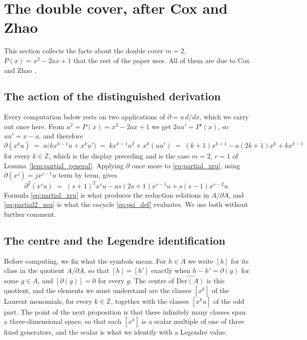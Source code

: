 \documentclass[11pt]{amsart}
\theoremstyle{definition}
\theoremstyle{remark}
\newcommand{\Z}{\mathbb{Z}}
\newcommand{\Der}{\mathrm{Der}}
\newcommand{\pa}{\partial}
\newcommand{\hDer}{\widehat{\Der(A)}}
\begin{document}
\section{The double cover, after Cox and Zhao}
\label{sec:quad_der}

This section collects the facts about the double cover $m=2$,
$P(x)=x^2-2ax+1$ that the rest of the paper uses. All of them are due to Cox
and Zhao \cite[\S2.1--\S2.2]{CoxZhao2018}.

\subsection{The action of the distinguished derivation}

Every computation below rests on two applications of $\pa=u\,d/dx$, which we
carry out once here. From $u^2=P(x)=x^2-2ax+1$ we get $2uu'=P'(x)$, so
$uu'=x-a$, and therefore
\begin{equation}\label{eq:partial_xru}
  \pa(x^k u) \;=\; u\bigl(kx^{k-1}u + x^ku'\bigr)
  \;=\; kx^{k-1}u^2 + x^k(uu')
  \;=\; (k+1)x^{k+1} - a(2k+1)x^k + kx^{k-1}
\end{equation}
for every $k\in\Z$, which is the display preceding \cite[(2.22)]{CoxZhao2018}
and is the case $m=2$, $r=1$ of Lemma~\ref{lem:partial_general}. Applying $\pa$
once more to \eqref{eq:partial_xru}, using $\pa(x^j)=jx^{j-1}u$ term by term,
gives
\begin{equation}\label{eq:partial2_xsu}
  \pa^2(x^s u) \;=\; (s+1)^2x^su - as(2s+1)x^{s-1}u + s(s-1)x^{s-2}u .
\end{equation}
Formula \eqref{eq:partial_xru} is what produces the reduction relations in
$A/\pa A$, and \eqref{eq:partial2_xsu} is what the cocycle
\eqref{eq:psi_def} evaluates. We use both without further comment.


\subsection{The centre and the Legendre identification}

Before computing, we fix what the symbols mean. For $h\in A$ we write $[h]$ for
its class in the quotient $A/\pa A$, so that $[h]=[h']$ exactly when
$h-h'=\pa(g)$ for some $g\in A$, and $[\pa(g)]=0$ for every $g$. The centre of
$\hDer$ is this quotient, and the elements we must understand are the classes
$[x^k]$ of the Laurent monomials, for every $k\in\Z$, together with the classes
$[x^ku]$ of the odd part. The point of the next proposition is that these
infinitely many classes span a three-dimensional space, so that each $[x^k]$ is
a scalar multiple of one of three fixed generators, and the scalar is what we
identify with a Legendre value.
\end{document}
